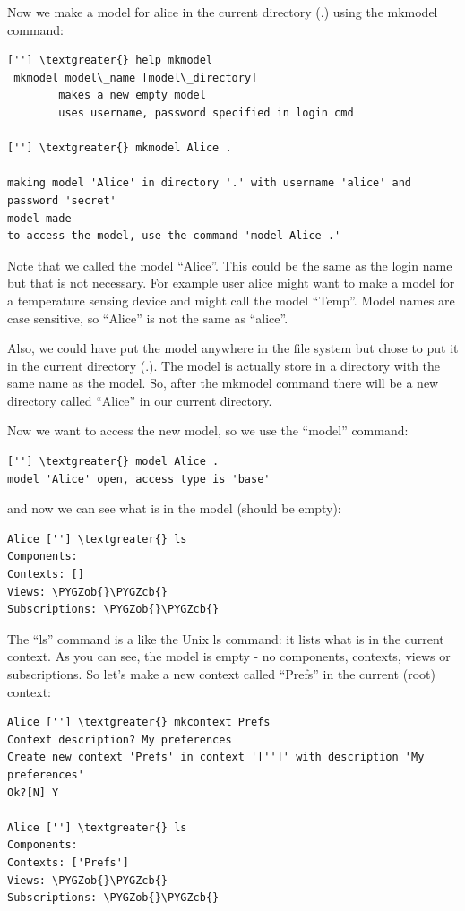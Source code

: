 \documentclass[a4paper,10pt,english]{sphinxmanual}
\def\PYGZob{\char`\{}
\def\PYGZcb{\char`\}}
\begin{document}
Now we make a model for alice in the current directory (.) using the
mkmodel command:

\begin{Verbatim}[commandchars=\\\{\}]
[''] \textgreater{} help mkmodel
 mkmodel model\_name [model\_directory]
        makes a new empty model
        uses username, password specified in login cmd

[''] \textgreater{} mkmodel Alice .

making model 'Alice' in directory '.' with username 'alice' and password 'secret'
model made
to access the model, use the command 'model Alice .'
\end{Verbatim}

Note that we called the model ``Alice''. This could be the same as the login
name but that is not necessary. For example user alice might want to make a
model for a temperature sensing device and might call the model ``Temp''.
Model names are case sensitive, so ``Alice'' is not the same as ``alice''.

Also, we could have put the model anywhere in the file system but chose
to put it in the current directory (.). The model is actually store in a
directory with the same name as the model. So, after the mkmodel command
there will be a new directory called ``Alice'' in our current directory.

Now we want to access the new model, so we use the ``model'' command:

\begin{Verbatim}[commandchars=\\\{\}]
 [''] \textgreater{} model Alice .
model 'Alice' open, access type is 'base'
\end{Verbatim}

and now we can see what is in the model (should be empty):

\begin{Verbatim}[commandchars=\\\{\}]
Alice [''] \textgreater{} ls
Components:
Contexts: []
Views: \PYGZob{}\PYGZcb{}
Subscriptions: \PYGZob{}\PYGZcb{}
\end{Verbatim}

The ``ls'' command is a like the Unix ls command: it lists what is in the
current context.
As you can see, the model is empty - no components, contexts, views or
subscriptions.
So let's make a new context called ``Prefs'' in the current (root) context:

\begin{Verbatim}[commandchars=\\\{\}]
Alice [''] \textgreater{} mkcontext Prefs
Context description? My preferences
Create new context 'Prefs' in context '['']' with description 'My preferences'
Ok?[N] Y

Alice [''] \textgreater{} ls
Components:
Contexts: ['Prefs']
Views: \PYGZob{}\PYGZcb{}
Subscriptions: \PYGZob{}\PYGZcb{}
\end{Verbatim}
\end{document}
